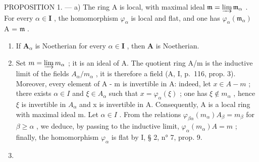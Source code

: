 PROPOSITION 1. --- a) The ring A is local, with maximal ideal \(\mathfrak{m} = \varinjlim \mathfrak{m}_{\alpha}\) . For every \(\alpha \in \mathbf{I}\) , the homomorphism \(\varphi_{\alpha}\) is local and flat, and one has \(\varphi_{\alpha}(\mathfrak{m}_{\alpha})\) A = \(\mathfrak{m}\) .

\begin{enumerate}
\def\labelenumi{\alph{enumi})}
\setcounter{enumi}{1}
\item
  If \(\mathbf{A}_{\alpha}\) is Noetherian for every \(\alpha \in \mathbf{I}\) , then \(\mathbf{A}\) is Noetherian.
\item
  Set \(m = \varinjlim m_{\alpha}\) ; it is an ideal of A. The quotient ring A/m is the inductive limit of the fields \(A_{\alpha}/m_{\alpha}\) , it is therefore a field (A, I, p.~116, prop. 3). Moreover, every element of A - m is invertible in A: indeed, let \(x \in A - m\) ; there exists \(\alpha \in I\) and \(\xi \in A_{\alpha}\) such that \(x = \varphi_{\alpha}(\xi)\) ; one has \(\xi \notin m_{\alpha}\) , hence \(\xi\) is invertible in \(A_{\alpha}\) and x is invertible in A. Consequently, A is a local ring with maximal ideal m. Let \(\alpha \in I\) . From the relations \(\varphi_{\beta\alpha}(m_{\alpha}) A_{\beta} = m_{\beta}\) for \(\beta \geqslant \alpha\) , we deduce, by passing to the inductive limit, \(\varphi_{\alpha}(m_{\alpha}) A = m\) ; finally, the homomorphism \(\varphi_{\alpha}\) is flat by I, § 2, n° 7, prop. 9.
\item

\end{enumerate}
